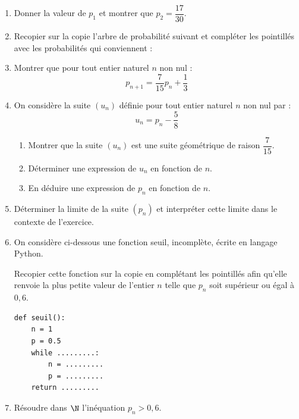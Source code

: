 \begin{enumerate}
\item Donner la valeur de $p_1$ et montrer que $p_2 = \dfrac{17}{30}$.

\item Recopier sur la copie l'arbre de probabilité suivant et compléter les pointillés avec les probabilités qui conviennent :

\begin{center}
\end{center}

\item Montrer que pour tout entier naturel $n$ non nul :
\[
p_{n+1}=\dfrac{7}{15}p_n+\dfrac{1}{3}
\]

\item On considère la suite $\left(u_n\right)$ définie pour tout entier naturel $n$ non nul par :
\[
u_n=p_n-\dfrac{5}{8}
\]

\begin{enumerate}
\item Montrer que la suite $\left(u_n\right)$ est une suite géométrique de raison $\dfrac{7}{15}$.
\item Déterminer une expression de $u_n$ en fonction de $n$.
\item En déduire une expression de $p_n$ en fonction de $n$.
\end{enumerate}

\item Déterminer la limite de la suite $\left(p_n\right)$ et interpréter cette limite dans le contexte de l'exercice.

\item On considère ci-dessous une fonction seuil, incomplète, écrite en langage Python.

Recopier cette fonction sur la copie en complétant les pointillés afin qu'elle renvoie la plus petite valeur de l'entier $n$ telle que $p_n$ soit supérieur ou égal à $0,6$.

\begin{Verbatim}[frame=single]
def seuil():
    n = 1
    p = 0.5
    while .........:
        n = .........
        p = .........
    return .........
\end{Verbatim}

\item Résoudre dans $\N$ l'inéquation $p_n > 0,6$.
\end{enumerate}
